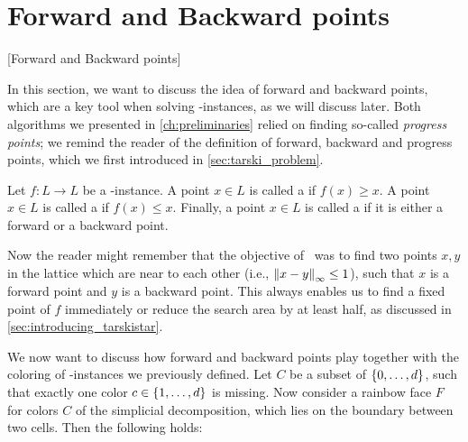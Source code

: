 \section{Forward and Backward points}[Forward and Backward points]

In this section, we want to discuss the idea of forward and backward points, which are a key tool when solving \Tarski-instances, as we will discuss later. Both algorithms we presented in \cref{ch:preliminaries} relied on finding so-called \emph{progress points}; we remind the reader of the definition of forward, backward and progress points, which we first introduced in \cref{sec:tarski_problem}.

\begin{definition}
	Let $f: L \rightarrow L$ be a \Tarski-instance. A point $x \in L$ is called a  if $f(x) \geq x$. A point $x \in L$ is called a  if $f(x) \leq x$. Finally, a point $x \in L$ is called a  if it is either a forward or a backward point.
\end{definition}

Now the reader might remember that the objective of \Tarskistar\ was to find two points $x, y$ in the lattice which are near to each other (i.e., $\left\lVert x-y\right\rVert_{\infty}\leq 1$), such that $x$ is a forward point and $y$ is a backward point. This always enables us to find a fixed point of $f$ immediately or reduce the search area by at least half, as discussed in \cref{sec:introducing_tarskistar}.

We now want to discuss how forward and backward points play together with the coloring of \Tarski-instances we previously defined. Let $C$ be a subset of $\left\{0, \dots, d\right\}$, such that exactly one color $c \in \left\{1, \dots, d\right\}$ is missing. Now consider a rainbow face $F$ for colors $C$ of the simplicial decomposition, which lies on the boundary between two cells. Then the following holds:

